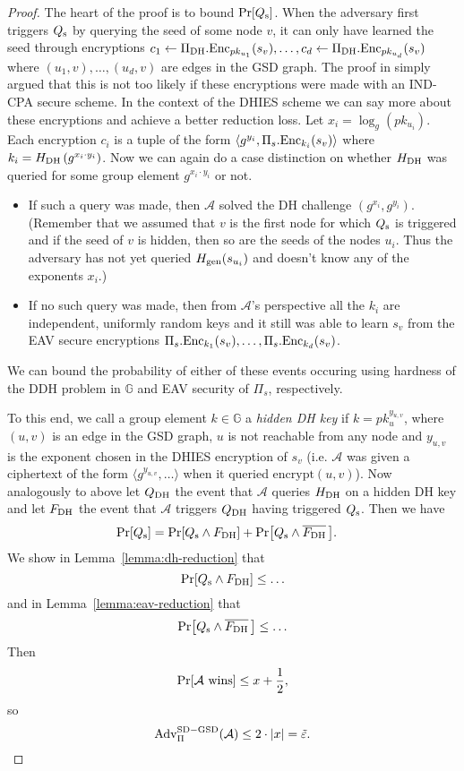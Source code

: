 \begin{proof}
	The heart of the proof is to bound $\pr{\qs}$. When the adversary first triggers $\qs$ by querying the seed of some node $v$, it can only have learned the seed through encryptions $c_1 \from \dhies.\mathrm{Enc}_{pk_{u_1}}(s_v), \ldots, c_d \from \dhies.\mathrm{Enc}_{pk_{u_d}}(s_v)$ where $(u_1, v), \ldots, (u_d, v)$ are edges in the GSD graph. The proof in \cite{ttkem} simply argued that this is not too likely if these encryptions were made with an IND-CPA secure scheme. In the context of the DHIES scheme we can say more about these encryptions and achieve a better reduction loss. Let $x_i = \log_g(pk_{u_i})$. Each encryption $c_i$ is a tuple of the form $\langle g^{y_i}, \Pi_s.\enc_{k_i}(s_v) \rangle$ where $k_i = \hdh\left(g^{x_i \cdot y_i}\right)$. Now we can again do a case distinction on whether $\hdh$ was queried for some group element $g^{x_i \cdot y_i}$ or not.
	\begin{itemize}
		\item If such a query was made, then $\mathcal{A}$ solved the DH challenge $(g^{x_i}, g^{y_i})$. (Remember that we assumed that $v$ is the first node for which $\qs$ is triggered and if the seed of $v$ is hidden, then so are the seeds of the nodes $u_i$. Thus the adversary has not yet queried $\hgen(s_{u_i})$ and doesn't know any of the exponents $x_i$.)
		\item If no such query was made, then from $\mathcal{A}$'s perspective all the $k_i$ are independent, uniformly random keys and it still was able to learn $s_v$ from the EAV secure encryptions $\Pi_s.\enc_{k_1}(s_v), \ldots, \Pi_s.\enc_{k_d}(s_v)$.
	\end{itemize}
	We can bound the probability of either of these events occuring using hardness of the DDH problem in $\mathbb{G}$ and EAV security of $\Pi_s$, respectively.

	To this end, we call a group element $k \in \mathbb{G}$ a \emph{hidden DH key} if $k = pk_u^{y_{u, v}}$, where $(u, v)$ is an edge in the GSD graph, $u$ is not reachable from any node and $y_{u, v}$ is the exponent chosen in the DHIES encryption of $s_v$ (i.e. $\mathcal{A}$ was given a ciphertext of the form $\langle g^{y_{u, v}}, \ldots\rangle$ when it queried $\mathrm{encrypt}(u, v)$). Now analogously to above let $\qdh$ the event that $\mathcal{A}$ queries $\hdh$ on a hidden DH key and let $\fdh$ the event that $\mathcal{A}$ triggers $\qdh$  having triggered $\qs$. Then we have
	\begin{align*}
		\pr{\qs} & = \pr{\qs \land \fdh} + \pr{\qs \land \overline{\fdh}\,}.
	\end{align*}
	We show in Lemma~\vref{lemma:dh-reduction} that
	$$
		\pr{\qs \land \fdh} \le \ldots
	$$
	and in Lemma~\vref{lemma:eav-reduction} that
	$$
		\pr{\qs \land \overline{\fdh}\,} \le \ldots
	$$
	Then
	$$
		\pr{\wins} \le x + \frac{1}{2},
	$$ so
	$$
		\mathrm{Adv}_{\Pi}^{\mathrm{SD-GSD}}(\mathcal{A}) \le 2 \cdot \abs*{x} = \tilde{\epsilon}.
	$$
\end{proof}

